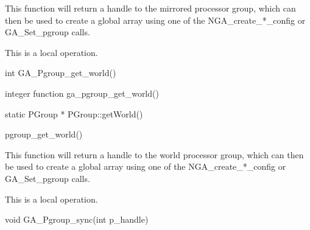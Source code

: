 \documentclass[12pt]{article}
\begin{document}
\local
\begin{desc}

This function will return a handle to the mirrored processor group, which can then be used to create a global array using one of the NGA_create_*_config or GA_Set_pgroup calls.

This is a local operation.
\end{desc}


\begin{capi}
\begin{ccode}
int GA_Pgroup_get_world()
\end{ccode}
\end{capi}

\begin{fapi}
\begin{fcode}
integer function ga_pgroup_get_world()
\end{fcode}
\end{fapi}

\begin{cxxapi}
\begin{cxxcode}
static PGroup * PGroup::getWorld()
\end{cxxcode}
\end{cxxapi}

\begin{pyapi}
\begin{pycode}
pgroup_get_world()
\end{pycode}
\end{pyapi}

\local
\begin{desc}

This function will return a handle to the world processor group, which can then be used to create a global array using one of the NGA_create_*_config or GA_Set_pgroup calls.

This is a local operation.
\end{desc}


\begin{capi}
\begin{ccode}
void GA_Pgroup_sync(int p_handle)
\end{ccode}
\begin{funcargs}
\end{funcargs}
\end{capi}
\end{document}
